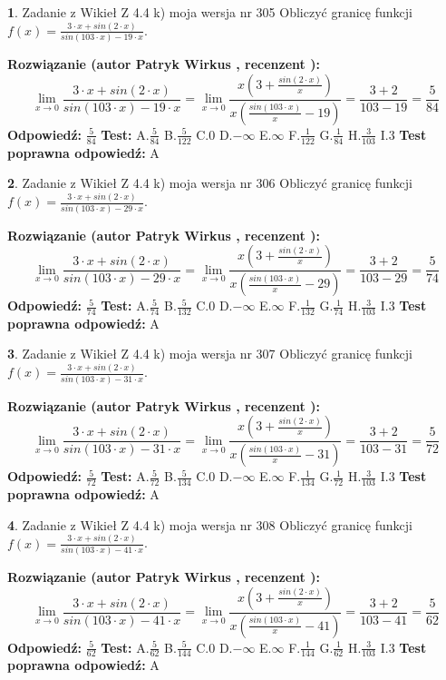 \documentclass[12pt, a4paper]{article}
\theoremstyle{definition} %
\newtheorem{zad}{}
\newcommand{\zadStart}[1]{\begin{zad}#1\newline}
\newcommand{\zadStop}{\end{zad}}
\newcommand{\rozwStart}[2]{\noindent \textbf{Rozwiązanie (autor #1 , recenzent #2): }\newline}
\newcommand{\rozwStop}{\newline}
\newcommand{\odpStart}{\noindent \textbf{Odpowiedź:}\newline}
\newcommand{\odpStop}{\newline}
\newcommand{\testStart}{\noindent \textbf{Test:}\newline}
\newcommand{\testStop}{\newline}
\newcommand{\kluczStart}{\noindent \textbf{Test poprawna odpowiedź:}\newline}
\newcommand{\kluczStop}{\newline}
\begin{document}
\zadStart{Zadanie z Wikieł Z 4.4 k) moja wersja nr 305}
Obliczyć granicę funkcji $f(x)=\frac{3\cdot x +sin(2\cdot x)}{sin(103\cdot x) -19\cdot x}$.
\zadStop
\rozwStart{Patryk Wirkus}{}
$$\lim\limits_{x\to 0}\frac{3\cdot x +sin(2\cdot x)}{sin(103\cdot x) -19\cdot x}
=\lim\limits_{x\to 0}\frac{x(3+\frac{sin(2\cdot x)}{x})}{x(\frac{sin(103\cdot x)}{x}-19)}
=\frac{3+2}{103-19} = \frac{5}{84}$$
\rozwStop
\odpStart
$\frac{5}{84}$
\odpStop
\testStart
A.$\frac{5}{84}$
B.$\frac{5}{122}$
C.$0$
D.$-\infty$
E.$\infty$
F.$\frac{1}{122}$
G.$\frac{1}{84}$
H.$\frac{3}{103}$
I.$3$
\testStop
\kluczStart
A
\kluczStop



\zadStart{Zadanie z Wikieł Z 4.4 k) moja wersja nr 306}
Obliczyć granicę funkcji $f(x)=\frac{3\cdot x +sin(2\cdot x)}{sin(103\cdot x) -29\cdot x}$.
\zadStop
\rozwStart{Patryk Wirkus}{}
$$\lim\limits_{x\to 0}\frac{3\cdot x +sin(2\cdot x)}{sin(103\cdot x) -29\cdot x}
=\lim\limits_{x\to 0}\frac{x(3+\frac{sin(2\cdot x)}{x})}{x(\frac{sin(103\cdot x)}{x}-29)}
=\frac{3+2}{103-29} = \frac{5}{74}$$
\rozwStop
\odpStart
$\frac{5}{74}$
\odpStop
\testStart
A.$\frac{5}{74}$
B.$\frac{5}{132}$
C.$0$
D.$-\infty$
E.$\infty$
F.$\frac{1}{132}$
G.$\frac{1}{74}$
H.$\frac{3}{103}$
I.$3$
\testStop
\kluczStart
A
\kluczStop



\zadStart{Zadanie z Wikieł Z 4.4 k) moja wersja nr 307}
Obliczyć granicę funkcji $f(x)=\frac{3\cdot x +sin(2\cdot x)}{sin(103\cdot x) -31\cdot x}$.
\zadStop
\rozwStart{Patryk Wirkus}{}
$$\lim\limits_{x\to 0}\frac{3\cdot x +sin(2\cdot x)}{sin(103\cdot x) -31\cdot x}
=\lim\limits_{x\to 0}\frac{x(3+\frac{sin(2\cdot x)}{x})}{x(\frac{sin(103\cdot x)}{x}-31)}
=\frac{3+2}{103-31} = \frac{5}{72}$$
\rozwStop
\odpStart
$\frac{5}{72}$
\odpStop
\testStart
A.$\frac{5}{72}$
B.$\frac{5}{134}$
C.$0$
D.$-\infty$
E.$\infty$
F.$\frac{1}{134}$
G.$\frac{1}{72}$
H.$\frac{3}{103}$
I.$3$
\testStop
\kluczStart
A
\kluczStop



\zadStart{Zadanie z Wikieł Z 4.4 k) moja wersja nr 308}
Obliczyć granicę funkcji $f(x)=\frac{3\cdot x +sin(2\cdot x)}{sin(103\cdot x) -41\cdot x}$.
\zadStop
\rozwStart{Patryk Wirkus}{}
$$\lim\limits_{x\to 0}\frac{3\cdot x +sin(2\cdot x)}{sin(103\cdot x) -41\cdot x}
=\lim\limits_{x\to 0}\frac{x(3+\frac{sin(2\cdot x)}{x})}{x(\frac{sin(103\cdot x)}{x}-41)}
=\frac{3+2}{103-41} = \frac{5}{62}$$
\rozwStop
\odpStart
$\frac{5}{62}$
\odpStop
\testStart
A.$\frac{5}{62}$
B.$\frac{5}{144}$
C.$0$
D.$-\infty$
E.$\infty$
F.$\frac{1}{144}$
G.$\frac{1}{62}$
H.$\frac{3}{103}$
I.$3$
\testStop
\kluczStart
A
\kluczStop
\end{document}
